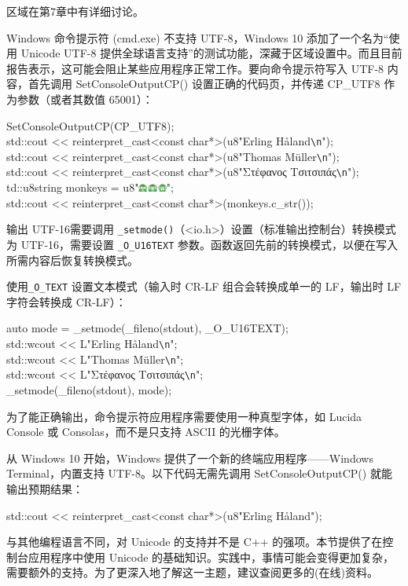 \begin{myNotic}
区域在第7章中有详细讨论。
\end{myNotic}

Windows 命令提示符 (cmd.exe) 不支持 UTF-8，Windows 10 添加了一个名为“使用 Unicode UTF-8 提供全球语言支持”的测试功能，深藏于区域设置中。而且目前报告表示，这可能会阻止某些应用程序正常工作。要向命令提示符写入 UTF-8 内容，首先调用 SetConsoleOutputCP() 设置正确的代码页，并传递 CP\_UTF8 作为参数（或者其数值 65001）：

\begin{tcolorbox}[ breakable,colback = blue!5!white, colframe=black!7!white]
\scriptsize{
SetConsoleOutputCP(CP\_UTF8); \\
std::cout <{}< reinterpret\_cast<const char*>(u8"Erling Håland\verb|\n|"); \\
std::cout <{}< reinterpret\_cast<const char*>(u8"Thomas Müller\verb|\n|"); \\
std::cout <{}< reinterpret\_cast<const char*>(u8"Στέφανος Τσιτσιπάς\verb|\n|"); \\
td::u8string monkeys = u8"\includegraphics[width=0.07\textwidth]{content/chapter2/images/code-2.png}";\\
std::cout <{}< reinterpret\_cast<const char*>(monkeys.c\_str());
}
\end{tcolorbox}

输出 UTF-16需要调用 \verb|_setmode()|（<io.h>）设置（标准输出控制台）转换模式为 UTF-16，需要设置 \verb|_O_U16TEXT| 参数。函数返回先前的转换模式，以便在写入所需内容后恢复转换模式。

使用\verb|_O_TEXT| 设置文本模式（输入时 CR-LF 组合会转换成单一的 LF，输出时 LF 字符会转换成 CR-LF）：

\begin{tcolorbox}[ breakable,colback = blue!5!white, colframe=black!7!white]
\scriptsize{
auto mode = \_setmode(\_fileno(stdout), \_O\_U16TEXT); \\
std::wcout <{}< L"Erling Håland\verb|\n|"; \\
std::wcout <{}< L"Thomas Müller\verb|\n|"; \\
std::wcout <{}< L"Στέφανος Τσιτσιπάς\verb|\n|"; \\
\_setmode(\_fileno(stdout), mode);
}
\end{tcolorbox}

\begin{myNotic}
为了能正确输出，命令提示符应用程序需要使用一种真型字体，如 Lucida Console 或 Consolas，而不是只支持 ASCII 的光栅字体。
\end{myNotic}

从 Windows 10 开始，Windows 提供了一个新的终端应用程序——Windows Terminal，内置支持 UTF-8。以下代码无需先调用 SetConsoleOutputCP() 就能输出预期结果：

\begin{cpp}
std::cout << reinterpret_cast<const char*>(u8"Erling Håland\n");
\end{cpp}

与其他编程语言不同，对 Unicode 的支持并不是 C++ 的强项。本节提供了在控制台应用程序中使用 Unicode 的基础知识。实践中，事情可能会变得更加复杂，需要额外的支持。为了更深入地了解这一主题，建议查阅更多的(在线)资料。